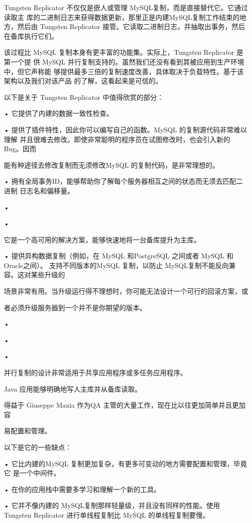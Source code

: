 Tungsten Replicator 不仅仅是嵌人或管理 MySQL复制，而是直接替代它。它通过读取主
库的二进制日志来获得数据更新，那里正是内建MySQL复制工作结束的地方，然后由
Tungsten Replicator 接管。它读取二进制日志，并抽取出事务，然后在备库执行它们。

该过程比 MySQL 复制本身有更丰富的功能集。实际上，Tungsten Replicator 是第一个提
供 MySQL 并行复制支持的。虽然我们还没有看到其被应用到生产环境中，但它声称能
够提供最多三倍的复制速度改善，具体取决于负载特性。基于该架构以及我们对该产品
的了解，这看起来是可信的。

以下是关于 Tungsten Replicator 中值得欣赏的部分：

• 它提供了内建的数据一致性检查。

• 提供了插件特性，因此你可以编写自己的函数。MySQL 的复制源代码非常难以理解
并且很难去修改。即使非常聪明的程序员在试图修改时，也会引入新的Bug。因而

能有种途径去修改复制而无须修改MySQL 的复制代码，是非常理想的。

• 拥有全局事务ID，能够帮助你了解每个服务器相互之间的状态而无须去匹配二进制
日志名和偏移量。

•

•

它是一个高可用的解决方案，能够快速地将一台备库提升为主库。

• 提供异构数据复制（例如，在 MySQL 和PostgreSQL 之间或者 MySQL 和Oracle之间）。
支持不同版本的MySQL 复制，以防止 MySQL复制不能反向兼容。这对某些升级的

场景非常有用。当升级运行得不理想时，你可能无法设计一个可行的回滚方案，或

者必须升级服务器到一个并不是你期望的版本。

•

•

•

并行复制的设计非常适用于共享应用程序或多任务应用程序。

Java 应用能够明确地写人主库并从备库读取。

得益于 Giuseppe Maxia 作为QA 主管的大量工作，现在比以往更加简单并且更加容

易配置和管理。

以下是它的一些缺点：

• 它比内建的MySQL 复制更加复杂，有更多可变动的地方需要配置和管理，毕竟它
是一个中间件。

• 在你的应用栈中需要多学习和理解一个新的工具。

• 它并不像内建的 MySQL复制那样轻量级，并且没有同样的性能。使用 Tungsten
Replicator 进行单线程复制比 MySQL 的单线程复制要慢。

